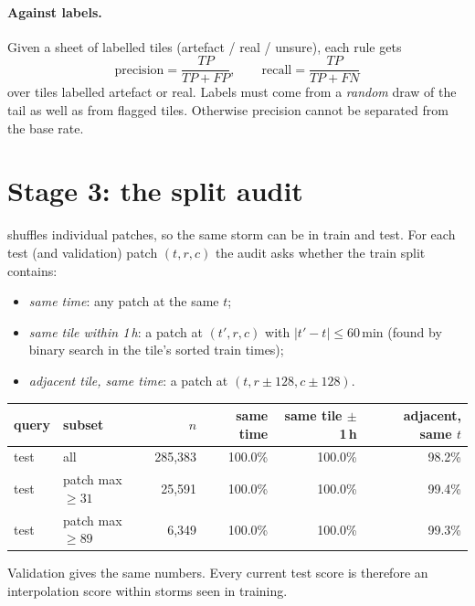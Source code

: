 \documentclass[11pt,a4paper]{article}
\theoremstyle{definition}
\theoremstyle{remark}
\newcommand{\1}{\mathbf{1}}
\newcommand{\code}[1]{\texttt{\detokenize{#1}}}
\begin{document}
\paragraph{Against labels.}
Given a sheet of labelled tiles (artefact / real / unsure), each rule gets
\begin{equation}
  \text{precision}=\frac{TP}{TP+FP},\qquad \text{recall}=\frac{TP}{TP+FN}
\end{equation}
over tiles labelled artefact or real. Labels must come from a \emph{random} draw of the tail
as well as from flagged tiles. Otherwise precision cannot be separated from the base rate.

\section{Stage 3: the split audit}\label{sec:splits}

\code{split_metadata.py} shuffles individual patches, so the same storm can be in train and
test. For each test (and validation) patch $(t,r,c)$ the audit asks whether the train split
contains:
\begin{itemize}[nosep]
\item \emph{same time}: any patch at the same $t$;
\item \emph{same tile within 1\,h}: a patch at $(t',r,c)$ with $|t'-t|\le60$\,min (found by
  binary search in the tile's sorted train times);
\item \emph{adjacent tile, same time}: a patch at $(t,r\pm128,c\pm128)$.
\end{itemize}

\begin{center}\small
\begin{tabular}{@{}llrrrr@{}}
\toprule
query & subset & $n$ & same time & same tile $\pm$1\,h & adjacent, same $t$ \\ \midrule
test & all & 285,383 & 100.0\% & 100.0\% & 98.2\% \\
test & patch max $\ge31$ & 25,591 & 100.0\% & 100.0\% & 99.4\% \\
test & patch max $\ge89$ & 6,349 & 100.0\% & 100.0\% & 99.3\% \\ \bottomrule
\end{tabular}
\end{center}
Validation gives the same numbers. Every current test score is therefore an interpolation
score within storms seen in training.
\end{document}
